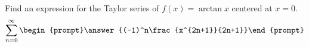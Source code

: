 \documentclass{ximera}
\author{Gregory Hartman \and Matthew Carr}
\begin{document}
\begin{exercise}






Find an expression for the Taylor series of $f(x)=\arctan x$ centered at $x=0$.
\[
\sum_{n=0}^{\infty}\begin{prompt}\answer{(-1)^n\frac{x^{2n+1}}{2n+1}}\end{prompt}
\]

\end{exercise}
\end{document}
